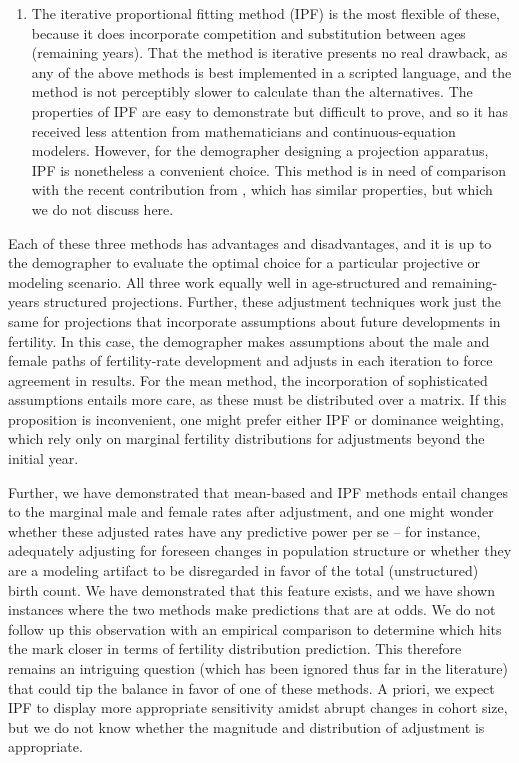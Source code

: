 \begin{enumerate}
\item The iterative proportional fitting method (IPF) is the most flexible of
these, because it does incorporate competition and substitution between ages
(remaining years). That the
method is iterative presents no real drawback, as any of the above methods is best 
implemented in a scripted language, and the method is
not perceptibly slower to calculate than the alternatives. The properties of
IPF are easy to demonstrate but difficult to prove, and so it has received less attention from
mathematicians and continuous-equation modelers. However, for the demographer
designing a projection apparatus, IPF is nonetheless a convenient choice. This method is in need of
comparison with the recent contribution from \citet{choo2006estimating}, which
has similar properties, but which we do not discuss here.
\end{enumerate}

Each of these three methods has advantages and disadvantages, and it is up to
the demographer to evaluate the optimal choice for a particular projective or
modeling scenario. All three work equally well in
age-structured and remaining-years structured projections. Further, these
adjustment techniques work just the same for projections that incorporate
assumptions about future developments in fertility. In this case, the
demographer makes assumptions about the male and female paths of fertility-rate development and adjusts in each
iteration to force agreement in results. For the mean method, the incorporation of sophisticated assumptions entails more care, as these must be
distributed over a matrix. If this proposition is inconvenient, one might prefer
either IPF or dominance weighting, which rely only on marginal fertility
distributions for adjustments beyond the initial year.

Further, we have demonstrated that mean-based and IPF methods
entail changes to the marginal male and female rates after adjustment, and one
might wonder whether these adjusted rates have any predictive power per se --
for instance, adequately adjusting for foreseen changes in population structure
or whether they are a modeling artifact to be disregarded in favor of the total (unstructured) birth count. We have demonstrated that this feature exists,
and we have shown instances where the two methods make predictions that are at
odds. We do not follow up this observation with an empirical comparison
to determine which hits the mark closer in terms of
fertility distribution prediction. This therefore remains an intriguing question
(which has been ignored thus far in the literature) that could tip the
balance in favor of one of these methods. A priori, we expect IPF 
to display more appropriate sensitivity amidst abrupt
changes in cohort size, but we do not know whether the magnitude and
distribution of adjustment is appropriate. 

